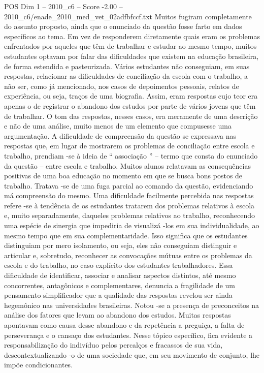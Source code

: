 \begin{textsample}{POS Dim 1 – 2010\_c6 – Score -2.00 – 2010\_c6/enade\_2010\_med\_vet\_02adfbfccf.txt}
Muitos fugiram completamente do assunto proposto, ainda que o enunciado da questão fosse farto em dados específicos ao tema.
Em vez de responderem diretamente quais eram os problemas enfrentados por aqueles que têm de trabalhar e estudar ao mesmo tempo, muitos estudantes optavam por falar das dificuldades que existem na educação brasileira, de forma estendida e pasteurizada.
Vários estudantes não conseguiam, em suas respostas, relacionar as dificuldades de conciliação da escola com o trabalho, a não ser, como já mencionado, nos casos de depoimentos pessoais, relatos de experiência, ou seja, traços de uma biografia.
Assim, eram respostas cujo teor era apenas o de registrar o abandono dos estudos por parte de vários jovens que têm de trabalhar.
O tom das respostas, nesses casos, era meramente de uma descrição e não de uma análise, muito menos de um elemento que compusesse uma argumentação.
A dificuldade de compreensão da questão se expressava nas respostas que, em lugar de mostrarem os problemas de conciliação entre escola e trabalho, prendiam -se à ideia de “ associação ” – termo que consta do enunciado da questão – entre escola e trabalho.
Muitos alunos relatavam as consequências positivas de uma boa educação no momento em que se busca bons postos de trabalho.
Tratava -se de uma fuga parcial ao comando da questão, evidenciando má compreensão do mesmo.
Uma dificuldade facilmente percebida nas respostas refere -se à tendência de os estudantes tratarem dos problemas relativos à escola e, muito separadamente, daqueles problemas relativos ao trabalho, reconhecendo uma espécie de sinergia que impediria de visualizá -los em sua individualidade, ao mesmo tempo que em sua complementaridade.
Isso significa que os estudantes distinguiam por mero isolamento, ou seja, eles não conseguiam distinguir e articular e, sobretudo, reconhecer as convocações mútuas entre os problemas da escola e do trabalho, no caso explícito dos estudantes trabalhadores.
Essa dificuldade de identificar, associar e analisar aspectos distintos, até mesmo concorrentes, antagônicos e complementares, denuncia a fragilidade de um pensamento simplificador que a qualidade das respostas revelou ser ainda hegemônico nas universidades brasileiras.
Notou -se a presença de preconceitos na análise dos fatores que levam ao abandono dos estudos.
Muitas respostas apontavam como causa desse abandono e da repetência a preguiça, a falta de perseverança e o cansaço dos estudantes.
Nesse tópico específico, fica evidente a responsabilização do indivíduo pelos percalços e fracassos de sua vida, descontextualizando -o de uma sociedade que, em seu movimento de conjunto, lhe impõe condicionantes.

\end{textsample}
